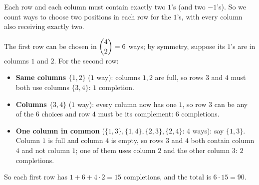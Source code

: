 Each row and each column must contain exactly two $1$'s (and two $-1$'s). So we count ways to choose two positions in each row for the $1$'s, with every column also receiving exactly two.

The first row can be chosen in $\dbinom42=6$ ways; by symmetry, suppose its $1$'s are in columns $1$ and $2$. For the second row:
\begin{itemize}
\item \textbf{Same columns $\{1,2\}$} ($1$ way): columns $1,2$ are full, so rows $3$ and $4$ must both use columns $\{3,4\}$: $1$ completion.
\item \textbf{Columns $\{3,4\}$} ($1$ way): every column now has one $1$, so row $3$ can be any of the $6$ choices and row $4$ must be its complement: $6$ completions.
\item \textbf{One column in common} ($\{1,3\},\{1,4\},\{2,3\},\{2,4\}$: $4$ ways): say $\{1,3\}$. Column $1$ is full and column $4$ is empty, so rows $3$ and $4$ both contain column $4$ and not column $1$; one of them uses column $2$ and the other column $3$: $2$ completions.
\end{itemize}
So each first row has $1+6+4\cdot2=15$ completions, and the total is $6\cdot15=\boxed{90}$.
